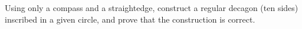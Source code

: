 Using only a compass and a straightedge, construct a regular decagon (ten sides) inscribed in a given circle, and prove that the construction is correct.
